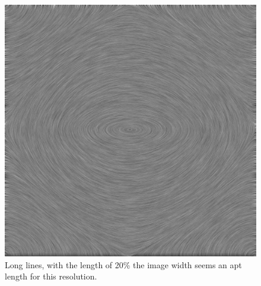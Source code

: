 \documentclass[a4paper,10pt]{report}
\begin{document}
\begin{figure}\centering
 \includegraphics[width=0.7\linewidth]{metsim_linelength_20_highdef.jpg}
 \caption{Long lines, with the length of 20\% the image width seems an apt length for this resolution.}
 \label{fig10}
\end{figure}
\end{document}
